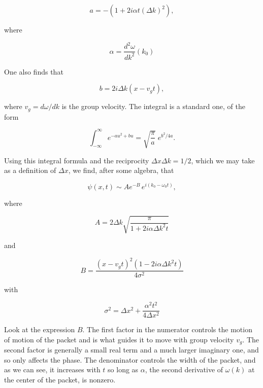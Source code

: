 \begin{equation}
  a = -(1 + 2i\alpha t  (\Delta k)^2),
\end{equation}

where 

\begin{equation}
\alpha = \frac{ d^2\omega }{ dk^2 }(k_0)
\end{equation}

One also finds that

\begin{equation}
  b = 2i\Delta k(x - v_g t),
\end{equation}

where $v_g = d\omega/dk$ is the group velocity.  The integral is a standard one, of the form

\begin{equation}
\int_{-\infty}^\infty e^{- au^2 + bu} = \sqrt{\frac{\pi}{a}}\; e^{ b^2/4a }.
\end{equation}

Using this integral  formula and the reciprocity $\Delta x\Delta k = 1/2$, which we may take as a definition of $\Delta x$, we find, after some algebra, that

\begin{equation}
\psi(x,t) \sim A e^{-B} \,e^{i(k_0 - \omega_0t)} 
,
\end{equation}

where

\begin{equation}
A = 2\Delta k \sqrt{\frac{\pi}{1 + 2i\alpha \Delta k^2 t}}
\end{equation}

and

\begin{equation}
B = \frac{( x-v_gt )^2 (1 - 2i\alpha \Delta k^2 t)}{4\sigma^2}
\end{equation}

with

\begin{equation}
\sigma^2 = \Delta x^2 + \frac{\alpha^2 t^2}{4 \Delta x^2}
\end{equation}

Look at the expression $B$. The first factor in the numerator controls the motion of motion of the packet and is what guides it to move with group velocity $v_g$.  The second factor is generally a small real term and a much larger imaginary one, and so only affects the phase.  The denominator controls the width of the packet, and as we can see, it increases with $t$ so long as $\alpha$, the second derivative of $\omega(k)$ at the center of the packet, is nonzero.  

